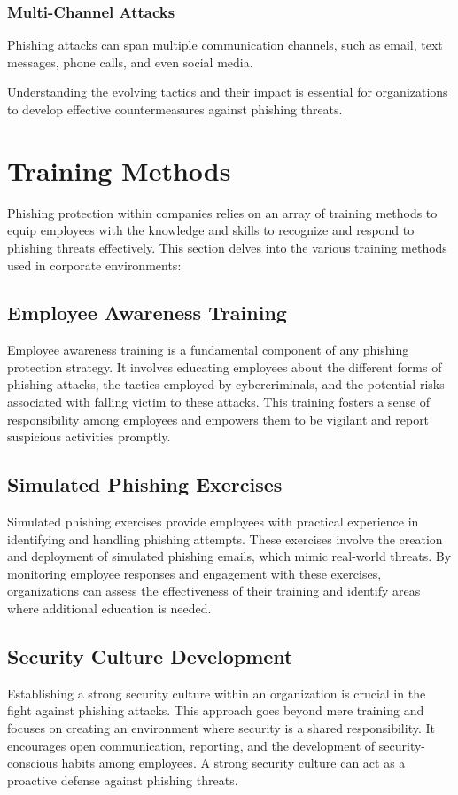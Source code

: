 \documentclass[conference]{IEEEtran}
\begin{document}
\subsubsection{ Multi-Channel Attacks}
Phishing attacks can span multiple communication channels, such as email, text messages, phone calls, and even social media.

Understanding the evolving tactics and their impact is essential for organizations to develop effective countermeasures against phishing threats.

\section{ Training Methods }\label{AA}
Phishing protection within companies relies on an array of training methods to equip employees with the knowledge and skills to recognize and respond to phishing threats effectively. This section delves into the various training methods used in corporate environments:

\subsection{Employee Awareness Training}
Employee awareness training is a fundamental component of any phishing protection strategy. It involves educating employees about the different forms of phishing attacks, the tactics employed by cybercriminals, and the potential risks associated with falling victim to these attacks. This training fosters a sense of responsibility among employees and empowers them to be vigilant and report suspicious activities promptly.

\subsection{Simulated Phishing Exercises}
Simulated phishing exercises provide employees with practical experience in identifying and handling phishing attempts. These exercises involve the creation and deployment of simulated phishing emails, which mimic real-world threats. By monitoring employee responses and engagement with these exercises, organizations can assess the effectiveness of their training and identify areas where additional education is needed.

\subsection{Security Culture Development}
Establishing a strong security culture within an organization is crucial in the fight against phishing attacks. This approach goes beyond mere training and focuses on creating an environment where security is a shared responsibility. It encourages open communication, reporting, and the development of security-conscious habits among employees. A strong security culture can act as a proactive defense against phishing threats.
\end{document}
